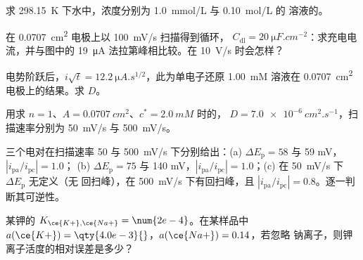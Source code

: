\begin{exercise}[$\star$]\label{exo:b3:electrode-kinetics:3}
求 \qty{298.15}{K} 下水中，浓度分别为 \qty{1.0}{mmol/L} 与 \qty{0.10}{mol/L}
的  溶液的。
\end{exercise}

\begin{exercise}[$\star$]\label{exo:b3:electrode-kinetics:4}
在 \qty{0.0707}{cm^2} 电极上以 \qty{100}{mV/s} 扫描得到循环， $C_{\mathrm{dl}} =
\qty{20}{\micro F.cm^{-2}}$：求充电电流，并与图中的
\qty{19}{\micro A} 法拉第峰相比较。在 \qty{10}{V/s} 时会怎样？
\end{exercise}

\begin{exercise}[$\star\star$]\label{exo:b3:electrode-kinetics:5}
电势阶跃后，$i\sqrt t = \qty{12.2}{\micro A.s^{1/2}}$，此为单电子还原
\qty{1.00}{mM} 溶液在 \qty{0.0707}{cm^2} 电极上的结果。求 $D$。
\end{exercise}

\begin{exercise}[$\star\star$]\label{exo:b3:electrode-kinetics:6}
用求 $n = 1$、$A = \qty{0.0707}{cm^2}$、$c^* = \qty{2.0}{mM}$ 时的，
$D = \qty{7.0e-6}{cm^2.s^{-1}}$，扫描速率分别为 \qty{50}{mV/s} 与 \qty{500}{mV/s}。
\end{exercise}

\begin{exercise}[$\star\star$]\label{exo:b3:electrode-kinetics:7}
三个电对在扫描速率 50 与 \qty{500}{mV/s} 下分别给出：(a) $\Delta E_{\mathrm p} = 58$ 与 59 mV，$|i_{\mathrm{pa}}/i_{\mathrm{pc}}| = 1.0$；
(b) $\Delta E_{\mathrm p} = 75$ 与 140 mV，$|i_{\mathrm{pa}}/i_{\mathrm{pc}}| = 1.0$；(c) 在 \qty{50}{mV/s} 下 $\Delta E_{\mathrm p}$ 无定义（无
回扫峰），在 \qty{500}{mV/s} 下有回扫峰，且 $|i_{\mathrm{pa}}/i_{\mathrm{pc}}| = 0.8$。逐一判断其可逆性。
\end{exercise}

\begin{exercise}[$\star\star$]\label{exo:b3:electrode-kinetics:8}
某钾的 $K_{\ce{K+},\ce{Na+}} = \num{2e-4}$。在某样品中 $a(\ce{K+}) =
\qty{4.0e-3}{}$，$a(\ce{Na+}) = 0.14$，若忽略
钠离子，则钾离子活度的相对误差是多少？
\end{exercise}

